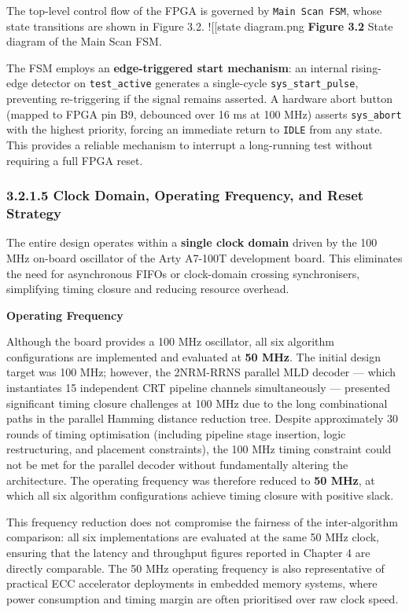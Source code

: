 \documentclass[
  12pt,
  a4paper]{report}
\begin{document}
The top-level control flow of the FPGA is governed by
\texttt{Main\ Scan\ FSM}, whose state transitions are shown in Figure
3.2. !{[}{[}state diagram.png\textbar298{]}{]} \textbf{Figure 3.2} State
diagram of the Main Scan FSM.

The FSM employs an \textbf{edge-triggered start mechanism}: an internal
rising-edge detector on \texttt{test\_active} generates a single-cycle
\texttt{sys\_start\_pulse}, preventing re-triggering if the signal
remains asserted. A hardware abort button (mapped to FPGA pin B9,
debounced over 16 ms at 100 MHz) asserts \texttt{sys\_abort} with the
highest priority, forcing an immediate return to \texttt{IDLE} from any
state. This provides a reliable mechanism to interrupt a long-running
test without requiring a full FPGA reset.

\subsubsection{3.2.1.5 Clock Domain, Operating Frequency, and Reset
Strategy}\label{clock-domain-operating-frequency-and-reset-strategy}

The entire design operates within a \textbf{single clock domain} driven
by the 100 MHz on-board oscillator of the Arty A7-100T development
board. This eliminates the need for asynchronous FIFOs or clock-domain
crossing synchronisers, simplifying timing closure and reducing resource
overhead.

\textbf{Operating Frequency}

Although the board provides a 100 MHz oscillator, all six algorithm
configurations are implemented and evaluated at \textbf{50 MHz}. The
initial design target was 100 MHz; however, the 2NRM-RRNS parallel MLD
decoder --- which instantiates 15 independent CRT pipeline channels
simultaneously --- presented significant timing closure challenges at
100 MHz due to the long combinational paths in the parallel Hamming
distance reduction tree. Despite approximately 30 rounds of timing
optimisation (including pipeline stage insertion, logic restructuring,
and placement constraints), the 100 MHz timing constraint could not be
met for the parallel decoder without fundamentally altering the
architecture. The operating frequency was therefore reduced to
\textbf{50 MHz}, at which all six algorithm configurations achieve
timing closure with positive slack.

This frequency reduction does not compromise the fairness of the
inter-algorithm comparison: all six implementations are evaluated at the
same 50 MHz clock, ensuring that the latency and throughput figures
reported in Chapter 4 are directly comparable. The 50 MHz operating
frequency is also representative of practical ECC accelerator
deployments in embedded memory systems, where power consumption and
timing margin are often prioritised over raw clock speed.
\end{document}
